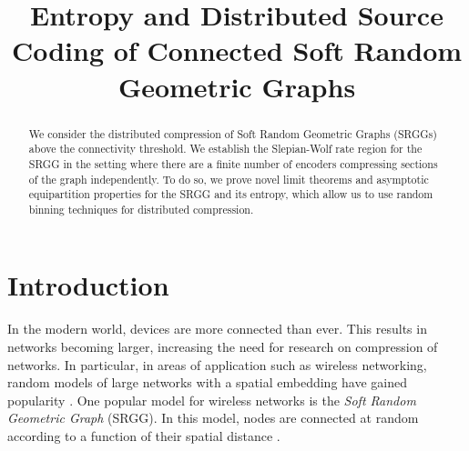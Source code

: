 \documentclass[conference,letterpaper]{IEEEtran}
\begin{document}
\title{Entropy and Distributed Source Coding of Connected Soft Random Geometric Graphs} 



\author{%
}




\maketitle

\begin{abstract}
    We consider the distributed compression of Soft Random Geometric Graphs (SRGGs) above the connectivity threshold. We establish the Slepian-Wolf rate region for the SRGG in the setting where there are a finite number of encoders compressing sections of the graph independently. To do so, we prove novel limit theorems and asymptotic equipartition properties for the SRGG and its entropy, which allow us to use random binning techniques for distributed compression.
\end{abstract}

\section{Introduction}

In the modern world, devices are more connected than ever. This results in networks becoming larger, increasing the need for research on compression of networks. In particular, in areas of application such as wireless networking, random models of large networks with a spatial embedding have gained popularity \cite{haenggi_2012}. One popular model for wireless networks is the \textit{Soft Random Geometric Graph} (SRGG). In this model, nodes are connected at random according to a function of their spatial distance \cite{penrose2016connectivity}. 
\end{document}
